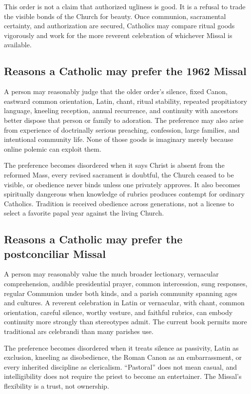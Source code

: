 This order is not a claim that authorized ugliness is good. It is a refusal to trade the visible bonds of the Church for beauty. Once communion, sacramental certainty, and authorization are secured, Catholics may compare ritual goods vigorously and work for the more reverent celebration of whichever Missal is available.

\subsection{Reasons a Catholic may prefer the 1962 Missal}

A person may reasonably judge that the older order's silence, fixed Canon, eastward common orientation, Latin, chant, ritual stability, repeated propitiatory language, kneeling reception, annual recurrence, and continuity with ancestors better dispose that person or family to adoration. The preference may also arise from experience of doctrinally serious preaching, confession, large families, and intentional community life. None of those goods is imaginary merely because online polemic can exploit them.

The preference becomes disordered when it says Christ is absent from the reformed Mass, every revised sacrament is doubtful, the Church ceased to be visible, or obedience never binds unless one privately approves. It also becomes spiritually dangerous when knowledge of rubrics produces contempt for ordinary Catholics. Tradition is received obedience across generations, not a license to select a favorite papal year against the living Church.

\subsection{Reasons a Catholic may prefer the postconciliar Missal}

A person may reasonably value the much broader lectionary, vernacular comprehension, audible presidential prayer, common intercession, sung responses, regular Communion under both kinds, and a parish community spanning ages and cultures. A reverent celebration in Latin or vernacular, with chant, common orientation, careful silence, worthy vesture, and faithful rubrics, can embody continuity more strongly than stereotypes admit. The current book permits more traditional ars celebrandi than many parishes use.

The preference becomes disordered when it treats silence as passivity, Latin as exclusion, kneeling as disobedience, the Roman Canon as an embarrassment, or every inherited discipline as clericalism. “Pastoral” does not mean casual, and intelligibility does not require the priest to become an entertainer. The Missal's flexibility is a trust, not ownership.

